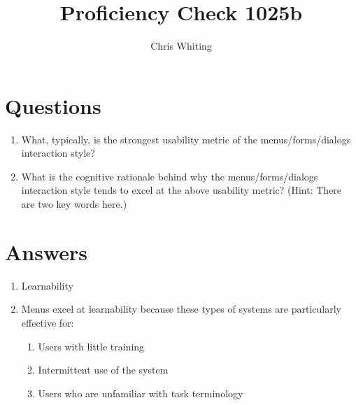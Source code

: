 \documentclass[11pt]{article}
\title{Proficiency Check 1025b}
\author{Chris Whiting}
\begin{document}
\maketitle

 
\section*{Questions}

\begin{enumerate}
\item What, typically, is the strongest usability metric of the menus/forms/dialogs interaction style?
\item What is the cognitive rationale behind why the menus/forms/dialogs interaction style tends to excel at the above usability metric? (Hint: There are two key words here.)
\end{enumerate}

\section*{Answers}

\begin{enumerate}
\item
 Learnability

\item
Menus excel at learnability because these types of systems are particularly effective for:
\begin{enumerate}
\item
Users with little training
\item
Intermittent use of the system
\item
Users who are unfamiliar with task terminology
\end{enumerate}

\end{enumerate}

%
%
\end{document}
